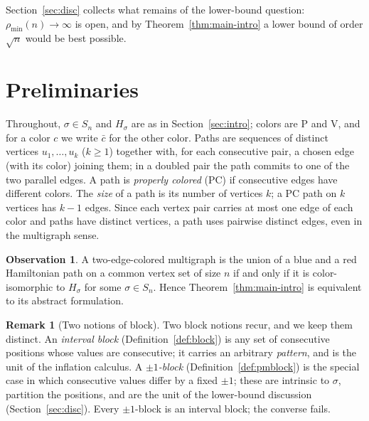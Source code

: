 \documentclass[11pt]{article}
\theoremstyle{definition}
\newtheorem{remark}[theorem]{Remark}
\newtheorem{observation}[theorem]{Observation}
\newcommand{\pmin}{\rho_{\min}}
\begin{document}
Section~\ref{sec:disc} collects what remains of the lower-bound question:
$\pmin(n) \to \infty$ is open, and by Theorem~\ref{thm:main-intro} a lower bound
of order $\sqrt n$ would be best possible.


\section{Preliminaries}\label{sec:prelim}

Throughout, $\sigma \in S_n$ and $H_\sigma$ are as in Section~\ref{sec:intro}; colors
are $\mathrm P$ and $\mathrm V$, and for a color $c$ we write $\bar c$ for the other
color. Paths are sequences of distinct vertices $u_1,\dots,u_k$ ($k \ge 1$) together
with, for each consecutive pair, a chosen edge (with its color) joining them; in a
doubled pair the path commits to one of the two parallel edges. A path is
\emph{properly colored} (PC) if consecutive edges have different colors. The
\emph{size} of a path is its number of vertices $k$; a PC path on $k$ vertices has
$k-1$ edges. Since each vertex pair carries at most one edge of each color and paths
have distinct vertices, a path uses pairwise distinct edges, even in the multigraph
sense.

\begin{observation}\label{obs:translate}
A two-edge-colored multigraph is the union of a blue and a red Hamiltonian path on a
common vertex set of size $n$ if and only if it is color-isomorphic to $H_\sigma$ for
some $\sigma \in S_n$. Hence Theorem~\ref{thm:main-intro} is equivalent to its
abstract formulation.
\end{observation}

\begin{remark}[Two notions of block]\label{rem:blocks}
Two block notions recur, and we keep them distinct. An \emph{interval block}
(Definition~\ref{def:block}) is any set of consecutive positions whose values are
consecutive; it carries an arbitrary \emph{pattern}, and is the unit of the inflation
calculus. A \emph{$\pm1$-block} (Definition~\ref{def:pmblock}) is the special case in
which consecutive values differ by a fixed $\pm1$; these are intrinsic to $\sigma$,
partition the positions, and are the unit of the lower-bound discussion
(Section~\ref{sec:disc}). Every $\pm1$-block is an interval block; the converse fails.
\end{remark}
\end{document}
